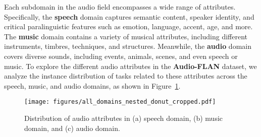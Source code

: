 

 Each subdomain in the audio field encompasses a wide range of attributes. Specifically, the \textbf{speech} domain captures semantic content, speaker identity, and critical paralinguistic features such as emotion, language, accent, age, and more. The \textbf{music} domain contains a variety of musical attributes, including different instruments, timbres, techniques, and structures. Meanwhile, the \textbf{audio} domain covers diverse sounds, including events, animals, scenes, and even speech or music. To explore the different audio attributes in the \textbf{Audio-FLAN} dataset, we analyze the instance distribution of tasks related to these attributes across the speech, music, and audio domains, as shown in Figure~\ref{fig:data_type_distribution}.

 \begin{figure}[h] %
    \centering %
    \texttt{[image: figures/all\_domains\_nested\_donut\_cropped.pdf]} %
    \caption{Distribution of audio attributes in (a) speech domain, (b) music domain, and (c) audio domain.}
    \label{fig:data_type_distribution}
\end{figure}

